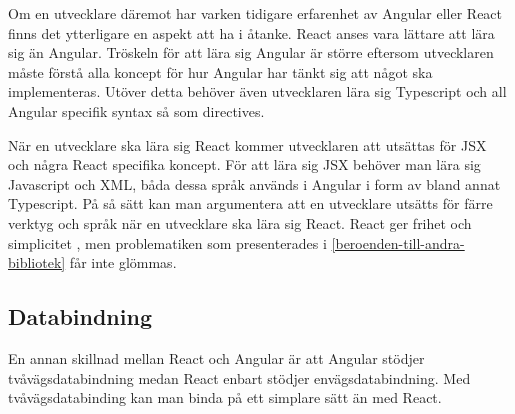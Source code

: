 Om en utvecklare däremot har varken tidigare erfarenhet av Angular eller React finns det ytterligare en aspekt att ha i åtanke. React anses vara lättare att lära sig än Angular.\cite[Adoption, Learning Curve and Development Experience]{sitepoint} Tröskeln för att lära sig Angular är större eftersom utvecklaren måste förstå alla koncept för hur Angular har tänkt sig att något ska implementeras. Utöver detta behöver även utvecklaren lära sig Typescript och all Angular specifik syntax så som directives. 

När en utvecklare ska lära sig React kommer utvecklaren att utsättas för JSX och några React specifika koncept. För att lära sig JSX behöver man lära sig Javascript och XML, båda dessa språk används i Angular i form av bland annat Typescript. På så sätt kan man argumentera att en utvecklare utsätts för färre verktyg och språk när en utvecklare ska lära sig React. React ger frihet och simplicitet \cite{react-angular-paper}, men problematiken som presenterades i \ref{beroenden-till-andra-bibliotek} får inte glömmas.


\subsection{Databindning}
En annan skillnad mellan React och Angular är att Angular stödjer tvåvägsdatabindning medan React enbart stödjer envägsdatabindning. Med tvåvägsdatabinding kan man binda på ett simplare sätt än med React.
